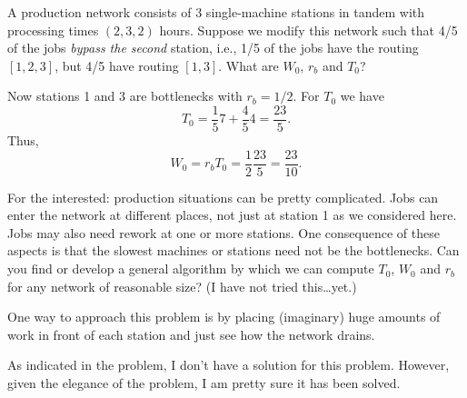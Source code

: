 \begin{question}
  A production network consists of 3 single-machine stations in tandem
  with processing times $(2, 3, 2)$ hours.  Suppose we modify this
  network such that 4/5 of the jobs \emph{bypass the second} station,
  i.e., 1/5 of the jobs have the routing $[1,2,3]$, but 4/5 have
  routing $[1,3]$.  What are $W_0$, $r_b$ and $T_0$?
\end{question}
\begin{solution}
  Now stations 1 and 3 are bottlenecks with $r_b = 1/2$. For $T_0$ we have
  \begin{equation*}
    T_0 = \frac15 7 + \frac45 4= \frac{23}5.
  \end{equation*}
Thus, 
\begin{equation*}
W_0 = r_b T_0 = \frac 12 \frac{23}5 = \frac{23}{10}.
\end{equation*}
\end{solution}




\begin{question}
  For the interested: production situations can be pretty
  complicated. Jobs can enter the network at different places, not
  just at station 1 as we considered here. Jobs may also need rework
  at one or more stations. One consequence of these aspects is that
  the slowest machines or stations need not be the bottlenecks. Can
  you find or develop a general algorithm by which we can compute
  $T_0$, $W_0$ and $r_b$ for any network of reasonable size? (I have
  not tried this\ldots yet.) 

  One way to approach this problem is by placing (imaginary) huge
  amounts of work in front of each station and just see how the network drains. 
  \begin{solution}
    As indicated in the problem, I don't have a solution for this
    problem. However, given the elegance of the problem, I am pretty
    sure it has been solved.
  \end{solution}

\end{question}

